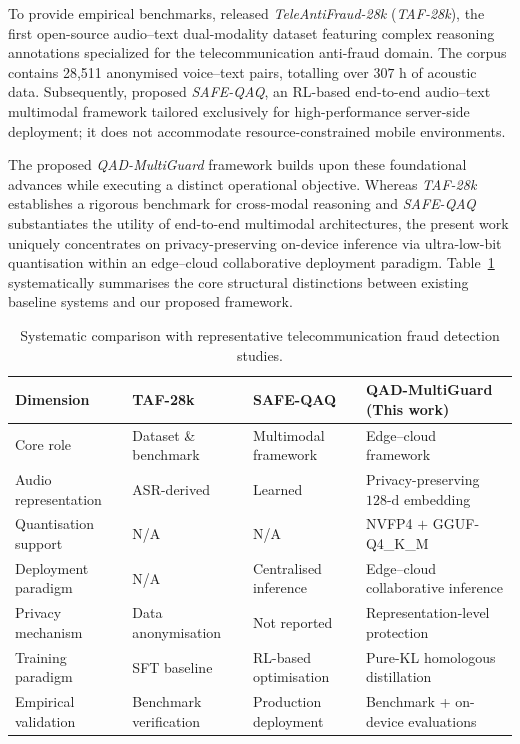 \documentclass[a4paper,fleqn]{cas-sc}
\begin{document}
To provide empirical benchmarks, \citet{1} released \textit{TeleAntiFraud-28k} (\textit{TAF-28k}), the first open-source audio--text dual-modality dataset featuring complex reasoning annotations specialized for the telecommunication anti-fraud domain. The corpus contains 28,511 anonymised voice--text pairs, totalling over $307\text{~h}$ of acoustic data. Subsequently, \citet{2} proposed \textit{SAFE-QAQ}, an RL-based end-to-end audio--text multimodal framework tailored exclusively for high-performance server-side deployment; it does not accommodate resource-constrained mobile environments.

The proposed \textit{QAD-MultiGuard} framework builds upon these foundational advances while executing a distinct operational objective. Whereas \textit{TAF-28k} establishes a rigorous benchmark for cross-modal reasoning and \textit{SAFE-QAQ} substantiates the utility of end-to-end multimodal architectures, the present work uniquely concentrates on privacy-preserving on-device inference via ultra-low-bit quantisation within an edge--cloud collaborative deployment paradigm. Table~\ref{tab1} systematically summarises the core structural distinctions between existing baseline systems and our proposed framework.

\begin{table}[t]
\centering
\caption{Systematic comparison with representative telecommunication fraud detection studies.}
\label{tab1}
\renewcommand{\arraystretch}{1.15}
\setlength{\tabcolsep}{8pt}
\begin{tabular}{@{} m{3cm} m{3.5cm} m{3.2cm} m{5cm} @{}}
\toprule
\textbf{Dimension} 
& \textbf{TAF-28k\newline\citep{1}} &\textbf{SAFE-QAQ\newline\citep{2}} 
& \textbf{QAD-MultiGuard (This work)}\\
\midrule
Core role 
& Dataset \& benchmark & Multimodal framework & Edge--cloud framework \\
\addlinespace[2pt]
Audio representation & ASR-derived & Learned & Privacy-preserving $128\text{-d}$ embedding \\
\addlinespace[2pt] Quantisation support & N/A & N/A & NVFP4 $+$ GGUF-Q4\_K\_M \\
\addlinespace[2pt] Deployment paradigm  & N/A & Centralised inference  & Edge--cloud collaborative inference \\
\addlinespace[2pt]
Privacy mechanism 
& Data anonymisation 
& Not reported 
& Representation-level protection \\
\addlinespace[2pt]
Training paradigm 
& SFT baseline 
& RL-based optimisation 
& Pure-KL homologous distillation \\
\addlinespace[2pt]
Empirical validation 
& Benchmark verification 
& Production deployment& Benchmark + on-device evaluations \\
\bottomrule
\end{tabular}
\end{table}
\end{document}
